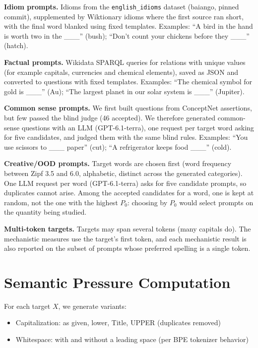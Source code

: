 \documentclass{article}
\begin{document}
\textbf{Idiom prompts.} Idioms from the \texttt{english\_idioms} dataset (baiango, pinned commit), supplemented by Wiktionary idioms where the first source ran short, with the final word blanked using fixed templates. Examples: ``A bird in the hand is worth two in the \_\_\_'' (bush); ``Don't count your chickens before they \_\_\_'' (hatch).

\textbf{Factual prompts.} Wikidata SPARQL queries for relations with unique values (for example capitals, currencies and chemical elements), saved as JSON and converted to questions with fixed templates. Examples: ``The chemical symbol for gold is \_\_\_'' (Au); ``The largest planet in our solar system is \_\_\_'' (Jupiter).

\textbf{Common sense prompts.} We first built questions from ConceptNet assertions, but few passed the blind judge (46 accepted). We therefore generated common-sense questions with an LLM (GPT-6.1-terra), one request per target word asking for five candidates, and judged them with the same blind rules. Examples: ``You use scissors to \_\_\_ paper'' (cut); ``A refrigerator keeps food \_\_\_'' (cold).

\textbf{Creative/OOD prompts.} Target words are chosen first (word frequency between Zipf 3.5 and 6.0, alphabetic, distinct across the generated categories). One LLM request per word (GPT-6.1-terra) asks for five candidate prompts, so duplicates cannot arise. Among the accepted candidates for a word, one is kept at random, not the one with the highest $P_0$: choosing by $P_0$ would select prompts on the quantity being studied.

\textbf{Multi-token targets.} Targets may span several tokens (many capitals do). The mechanistic measures use the target's first token, and each mechanistic result is also reported on the subset of prompts whose preferred spelling is a single token.

\section{Semantic Pressure Computation}
\label{app:pressure}

For each target $X$, we generate variants:
\begin{itemize}
    \item Capitalization: as given, lower, Title, UPPER (duplicates removed)
    \item Whitespace: with and without a leading space (per BPE tokenizer behavior)
\end{itemize}
\end{document}
